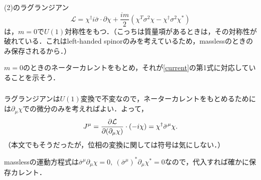 \documentclass[pdflatex,unicode,ja=standard,12pt]{beamer}
\begin{document}
\begin{frame}
  
  \frametitle{\subsecname}

  (2)のラグランジアン
  \begin{equation}
    \mathcal{L}
    =
    \chi^{\dag}i\bar{\sigma}\cdot\partial\chi
    +
    \frac{im}{2}(\chi^{T}\sigma^{2}\chi-\chi^{\dag}\sigma^2\chi^{*})
    \nonumber
  \end{equation}
  は，$m=0$で$U(1)$対称性をもつ．（こっちは質量項があるときは，その対称性が破れている．これはleft-handed spinorのみを考えているため，masslessのときのみ保存されるから．）
  
  \vspace{10pt}

  $m=0$のときのネーターカレントをもとめ，それが\eqref{current}の第1式に対応していることを示そう．
  
\end{frame}


\begin{frame}
  
  \frametitle{\subsecname}

  ラグランジアンは$U(1)$変換で不変なので，ネーターカレントをもとめるためには$\partial_{\mu}\chi$での微分のみを考えればよい．よって，
  \begin{equation}
    J^{\mu}
    =
    \pdv{\mathcal{L}}{(\partial_{\mu}\chi)}
    \cdot
    (-i\chi)
    =
    \chi^{\dag}\bar{\sigma}^{\mu}\chi
    .
  \end{equation}
  （本文でもそうだったが，位相の変換に関しては符号は気にしない．）

  masslessの運動方程式は$\bar{\sigma}^{\mu}\partial_{\mu}\chi=0,\ (\bar{\sigma}^{\mu})^{*}\partial_{\mu}\chi^{*}=0$なので，代入すれば確かに保存カレント．

\end{frame}
\end{document}
